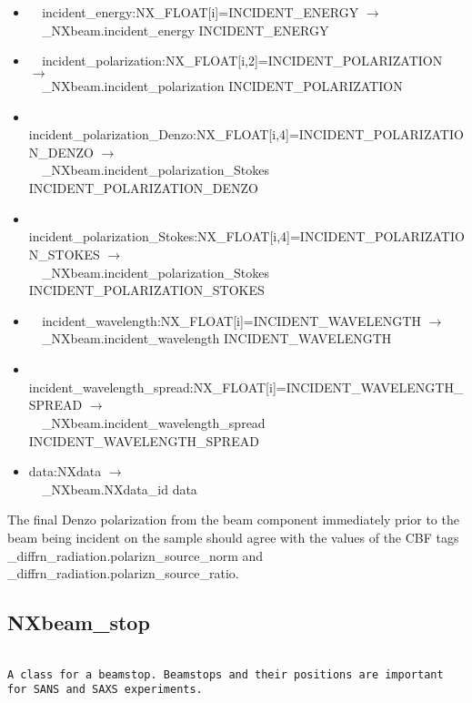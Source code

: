 \documentclass[11pt]{article}
\begin{document}
{{\begin{itemize}
\item{\verb|  |incident\_energy:NX\_FLOAT[i]=INCIDENT\_ENERGY $\rightarrow$\\
\verb|  |\_NXbeam.incident\_energy INCIDENT\_ENERGY}

\item{\verb|  |incident\_polarization:NX\_FLOAT[i,2]=INCIDENT\_POLARIZATION $\rightarrow$\\
\verb|  |\_NXbeam.incident\_polarization INCIDENT\_POLARIZATION}

\item{\verb|  |incident\_polarization\_Denzo:NX\_FLOAT[i,4]=INCIDENT\_POLARIZATION\_DENZO $\rightarrow$\\
\verb|  |\_NXbeam.incident\_polarization\_Stokes INCIDENT\_POLARIZATION\_DENZO}

\item{\verb|  |incident\_polarization\_Stokes:NX\_FLOAT[i,4]=INCIDENT\_POLARIZATION\_STOKES $\rightarrow$\\
\verb|  |\_NXbeam.incident\_polarization\_Stokes INCIDENT\_POLARIZATION\_STOKES}

\item{\verb|  |incident\_wavelength:NX\_FLOAT[i]=INCIDENT\_WAVELENGTH $\rightarrow$\\
\verb|  |\_NXbeam.incident\_wavelength INCIDENT\_WAVELENGTH}

\item{\verb|  |incident\_wavelength\_spread:NX\_FLOAT[i]=INCIDENT\_WAVELENGTH\_SPREAD $\rightarrow$\\
\verb|  |\_NXbeam.incident\_wavelength\_spread INCIDENT\_WAVELENGTH\_SPREAD}

\item{data:NXdata $\rightarrow$\\
\verb|  |\_NXbeam.NXdata\_id data}
\end{itemize}

The final Denzo polarization from the beam component immediately prior to the beam being incident on 
the sample should agree with the values of the CBF tags \_diffrn\_radiation.polarizn\_source\_norm
and \_diffrn\_radiation.polarizn\_source\_ratio.

\subsection{NXbeam\_stop}

\begin{verbatim}

A class for a beamstop. Beamstops and their positions are important for SANS and SAXS experiments.


\end{verbatim}}}
\end{document}
